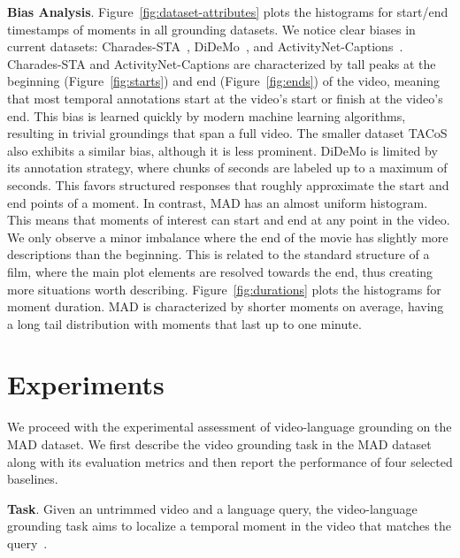 \documentclass[10pt,twocolumn,letterpaper]{article}
\renewcommand{\paragraph}[1]{\vspace{1mm}\noindent\textbf{#1}.}
\begin{document}
\paragraph{Bias Analysis} Figure~\ref{fig:dataset-attributes} plots the histograms for start/end timestamps of moments in all grounding datasets. We notice clear biases in current datasets: Charades-STA~\cite{Gao_2017_ICCV}, DiDeMo~\cite{Hendricks_2017_ICCV}, and ActivityNet-Captions~\cite{Krishna_2017_ICCV}. 
Charades-STA and ActivityNet-Captions are characterized by tall peaks at the beginning (Figure~\ref{fig:starts}) and end (Figure~\ref{fig:ends}) of the video, meaning that most temporal annotations start at the video's start or finish at the video's end. This bias is learned quickly by modern machine learning algorithms, resulting in trivial groundings that span a full video. The smaller dataset TACoS also exhibits a similar bias, although it is less prominent. DiDeMo is limited by its annotation strategy, where chunks of  seconds are labeled up to a maximum of  seconds. This favors structured responses that roughly approximate the start and end points of a moment. In contrast, MAD has an almost uniform histogram. This means that moments of interest can start and end at any point in the video. 
We only observe a minor imbalance where the end of the movie has slightly more descriptions than the beginning. This is related to the standard structure of a film, where the main plot elements are resolved towards the end, thus creating more situations worth describing. 
Figure~\ref{fig:durations} plots the histograms for moment duration. MAD is characterized by shorter moments on average, having a long tail distribution with moments that last up to one minute.



 \section{Experiments}\label{sec: experiments}
We proceed with the experimental assessment of video-language grounding on the MAD dataset. We first describe the video grounding task in the MAD dataset along with its evaluation metrics and then report the performance of four selected baselines.

\paragraph{Task}
Given an untrimmed video and a language query, the video-language grounding task aims to localize a temporal moment  in the video that matches the query~\cite{Gao_2017_ICCV,Hendricks_2017_ICCV}. 
\end{document}

